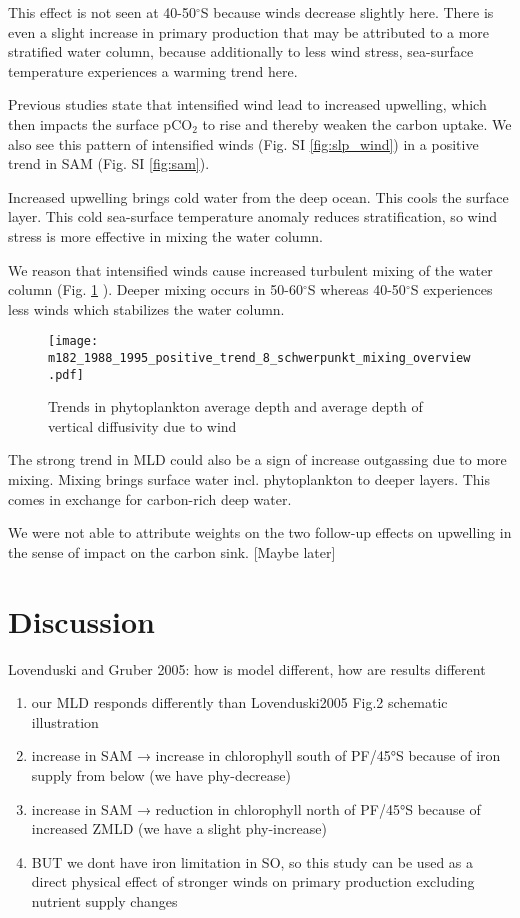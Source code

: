 \documentclass[12pt]{article}
\begin{document}
This effect is not seen at 40-50$^\circ$S because winds decrease slightly here. There is even a slight increase in primary production that may be attributed to a more stratified water column, because additionally to less wind stress, sea-surface temperature experiences a warming trend here.


Previous studies state that intensified wind lead to increased upwelling, which then impacts the surface pCO$_2$ to rise and thereby weaken the carbon uptake. We also see this pattern of intensified winds (Fig. SI \ref{fig:slp_wind}) in a positive trend in SAM (Fig. SI \ref{fig:sam}). 

Increased upwelling brings cold water from the deep ocean. This cools the surface layer. This cold sea-surface temperature anomaly reduces stratification, so wind stress is more effective in mixing the water column.


We reason that intensified winds cause increased turbulent mixing of the water column (Fig. \ref{fig:wind_mixing} ). Deeper mixing occurs in 50-60$^\circ$S whereas 40-50$^\circ$S experiences less winds which stabilizes the water column.

\begin{figure}
\texttt{[image: m182\_1988\_1995\_positive\_trend\_8\_schwerpunkt\_mixing\_overview.pdf]}
\caption{Trends in phytoplankton average depth and average depth of vertical diffusivity due to wind}
\label{fig:wind_mixing}
\end{figure}


The strong trend in MLD could also be a sign of increase outgassing due to more mixing. Mixing brings surface water incl. phytoplankton to deeper layers. This comes in exchange for carbon-rich deep water.

We were not able to attribute weights on the two follow-up effects on upwelling in the sense of impact on the carbon sink. [Maybe later]



\section{Discussion}
Lovenduski and Gruber 2005: how is model different, how are results different
\begin{enumerate}
\item our MLD responds differently than Lovenduski2005 Fig.2 schematic illustration
\item increase in SAM → increase in chlorophyll south of PF/45°S because of iron supply from below (we have phy-decrease)
\item increase in SAM → reduction in chlorophyll north of PF/45°S because of increased ZMLD (we have a slight phy-increase)
\item BUT we dont have iron limitation in SO, so this study can be used as a direct physical effect of stronger winds on primary production excluding nutrient supply changes
\end{enumerate} 
\end{document}
